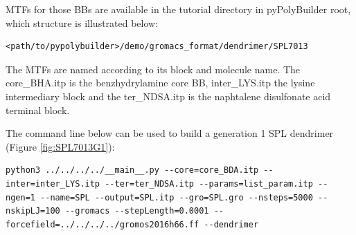 MTFs for those BBs are available in the tutorial directory in pyPolyBuilder root, which structure is illustrated below:
\begin{lstlisting}
<path/to/pypolybuilder>/demo/gromacs_format/dendrimer/SPL7013
\end{lstlisting}

The MTFs are named according to its block and molecule name.
The core\_BHA.itp is the benzhydrylamine core BB, inter\_LYS.itp the lysine intermediary block and the ter\_NDSA.itp is the naphtalene disulfonate acid terminal block.

The command line below can be used to build a generation 1 SPL dendrimer (Figure \ref{fig:SPL7013G1}):

\begin{lstlisting}
python3 ../../../../__main__.py --core=core_BDA.itp --inter=inter_LYS.itp --ter=ter_NDSA.itp --params=list_param.itp --ngen=1 --name=SPL --output=SPL.itp --gro=SPL.gro --nsteps=5000 --nskipLJ=100 --gromacs --stepLength=0.0001 --forcefield=../../../../gromos2016h66.ff --dendrimer
\end{lstlisting}


